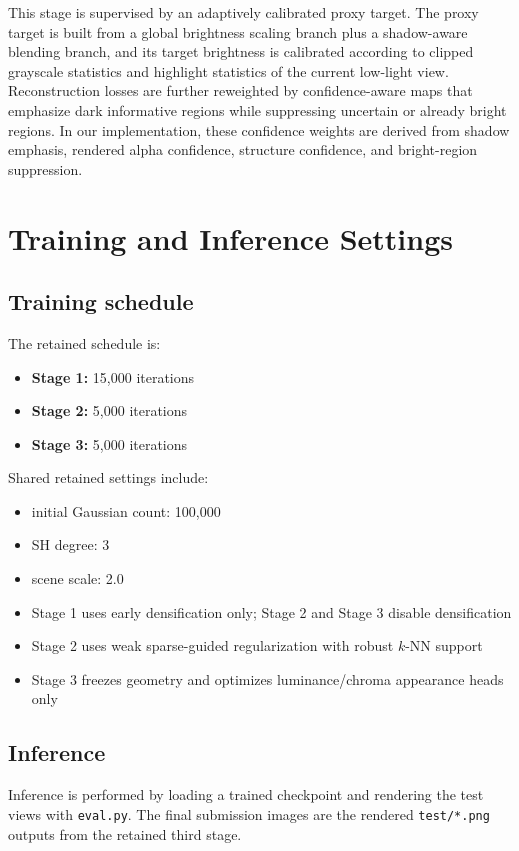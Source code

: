 \documentclass[10pt,a4paper]{article}
\begin{document}
This stage is supervised by an adaptively calibrated proxy target. The proxy target is built from a global brightness scaling branch plus a shadow-aware blending branch, and its target brightness is calibrated according to clipped grayscale statistics and highlight statistics of the current low-light view. Reconstruction losses are further reweighted by confidence-aware maps that emphasize dark informative regions while suppressing uncertain or already bright regions. In our implementation, these confidence weights are derived from shadow emphasis, rendered alpha confidence, structure confidence, and bright-region suppression.

\section{Training and Inference Settings}
\subsection{Training schedule}
The retained schedule is:
\begin{itemize}[leftmargin=2em]
  \item \textbf{Stage 1:} 15{,}000 iterations
  \item \textbf{Stage 2:} 5{,}000 iterations
  \item \textbf{Stage 3:} 5{,}000 iterations
\end{itemize}

Shared retained settings include:
\begin{itemize}[leftmargin=2em]
  \item initial Gaussian count: 100{,}000
  \item SH degree: 3
  \item scene scale: 2.0
  \item Stage 1 uses early densification only; Stage 2 and Stage 3 disable densification
  \item Stage 2 uses weak sparse-guided regularization with robust $k$-NN support
  \item Stage 3 freezes geometry and optimizes luminance/chroma appearance heads only
\end{itemize}

\subsection{Inference}
Inference is performed by loading a trained checkpoint and rendering the test views with \texttt{eval.py}. The final submission images are the rendered \texttt{test/*.png} outputs from the retained third stage.
\end{document}
